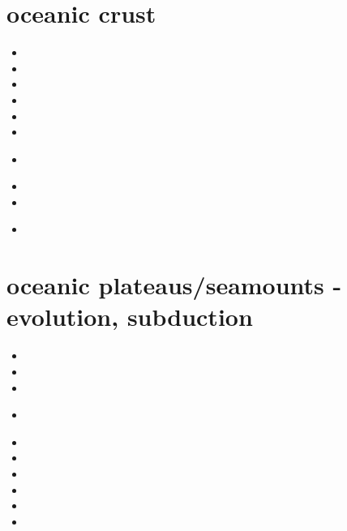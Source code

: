 \section{oceanic crust} 

\begin{small}
\begin{itemize}
\item[\nineteeneightyeight] 
\item[\nineteenninetyfour] 
\item[\nineteenninetysix] 
\item[\twothousandfour] 
\item[\twothousandseven] 
\item[\twothousandeight] 
\item[\twothousandthirteen] 
 \\
\item[\twothousandfifteen] 
\item[\twothousandseventeen] 
\item[\twothousandtwenty] 
 \\ 
\end{itemize}
\end{small}




\section{oceanic plateaus/seamounts - evolution, subduction}

\begin{small}
\begin{itemize}
\item[\twothousandtwo]
\item[\twothousandtwelve]
\item[\twothousandthirteen]
\item[\twothousandfourteen]
\\
\item[\twothousandfifteen]
\item[\twothousandsixteen]
\item[\twothousandtwenty]
\item[\twothousandtwentyone]
\item[\twothousandtwentytwo]
\item[\twothousandtwentythree]
\end{itemize}
\end{small}



